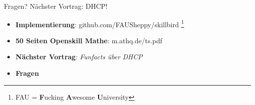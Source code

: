 \documentclass{beamer}
\begin{document}
\begin{frame}{Fragen? Nächster Vortrag: DHCP!}
\begin{itemize}
\item \textbf{Implementierung}: github.com/FAUSheppy/skillbird
\footnote{\tiny FAU = \textbf{F}ucking \textbf{A}wesome \textbf{U}niversity}
\item \textbf{50 Seiten Openskill Mathe}: m.athq.de/ts.pdf
\item \textbf{Nächster Vortrag}: \textit{Funfacts über DHCP}
\item \textbf{Fragen}
\end{itemize}
\end{frame}
\end{document}
